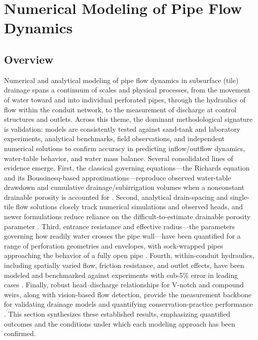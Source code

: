 \documentclass[11pt]{article}
\begin{document}
\section*{Numerical Modeling of Pipe Flow Dynamics}

\subsection{Overview}

Numerical and analytical modeling of pipe flow dynamics in subsurface (tile) drainage
spans a continuum of scales and physical processes, from the movement of water toward
and into individual perforated pipes, through the hydraulics of flow within the conduit
network, to the measurement of discharge at control structures and outlets. Across this
theme, the dominant methodological signature is validation: models are consistently
tested against sand-tank and laboratory experiments, analytical benchmarks, field
observations, and independent numerical solutions to confirm accuracy in predicting
inflow/outflow dynamics, water-table behavior, and water mass balance. Several
consolidated lines of evidence emerge. First, the classical governing equations---the
Richards equation and its Boussinesq-based approximations---reproduce observed
water-table drawdown and cumulative drainage/subirrigation volumes when a nonconstant
drainable porosity is accounted for \parencite{TANG1977,Xin2016c}. Second, analytical
drain-spacing and single-tile flow solutions closely track numerical simulations and
observed heads, and newer formulations reduce reliance on the difficult-to-estimate
drainable porosity parameter \parencite{Cooke2001,KUMAR1994,SINGH1992,FathAllah2025,Chahar2010}.
Third, entrance resistance and effective radius---the parameters governing how readily
water crosses the pipe wall---have been quantified for a range of perforation geometries
and envelopes, with sock-wrapped pipes approaching the behavior of a fully open pipe
\parencite{Ghane2022,Ghane2022b,Gaj2020,Oyarce2017}. Fourth, within-conduit hydraulics,
including spatially varied flow, friction resistance, and outlet effects, have been
modeled and benchmarked against experiments with sub-5\% error in leading cases
\parencite{Bayat2011,Kouchakzadeh2011,Abdurrasheed2019,Graber2004,Nédélec2008}. Finally,
robust head--discharge relationships for V-notch and compound weirs, along with
vision-based flow detection, provide the measurement backbone for validating drainage
models and quantifying conservation-practice performance
\parencite{Christianson2019,BinShokrana2021,Katuwal2024,Napierala2023,Popek2021,Young2023}.
This section synthesizes these established results, emphasizing quantified outcomes and
the conditions under which each modeling approach has been confirmed.
\end{document}

